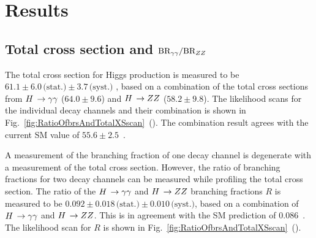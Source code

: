 \section{Results}

\subsection{Total cross section and \texorpdfstring{$\text{BR}_{\gamma\gamma}/\text{BR}_{ZZ}$}{BRgg/BRZZ}}
\label{sec:ratioOfBrsTotalXS}


The total cross section for Higgs production is measured to be
$61.1   \pm 6.0 \,\text{(stat.)}   \pm 3.7 \,\text{(syst.)}  $\pb
, based on a combination of the total cross sections from $H\,\to\gamma\gamma$ ($64.0\pm9.6$\pb)
and $H\,\to ZZ$ ($58.2\pm9.8$\pb).
% 
The likelihood scans for the individual decay channels and their combination is shown in
Fig.~\ref{fig:RatioOfbrsAndTotalXSscan}~(\cmsLeft).
% 
The combination result agrees with the current SM value of $55.6\pm2.5$\pb~\cite{deFlorian:2016spz}.

A measurement of the branching fraction of one decay channel is degenerate with a measurement of the total cross section.
% 
However, the ratio of branching fractions for two decay channels can be measured while profiling the total cross section.
% 
The ratio of the $H\,\to\gamma\gamma$ and $H\,\to ZZ$ branching fractions $R$ is measured to be
$0.092   \pm 0.018 \,\text{(stat.)}   \pm 0.010 \,\text{(syst.)}  $, based on a combination of $H\,\to\gamma\gamma$ and $H\,\to ZZ$.
% 
This is in agreement with the SM prediction of $0.086$~\cite{deFlorian:2016spz}.
% 
The likelihood scan for $R$ is shown in Fig.~\ref{fig:RatioOfbrsAndTotalXSscan}~(\cmsRight).

